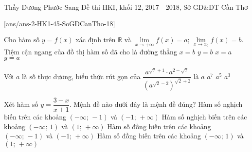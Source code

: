 \begin{name}
	{Thầy Dương Phước Sang}
	{Đề thi HKI, khối 12, 2017 - 2018, Sở GD\&ĐT Cần Thơ}
\end{name}
\setcounter{ex}{0}\setcounter{bt}{0}
[ans/ans-2-HK1-45-SoGDCanTho-18]

\begin{ex}%
	Cho hàm số $y=f(x)$ xác định trên $\mathbb{R}$ và $\displaystyle\lim\limits_{x\to +\infty}f(x)=a;\,\displaystyle\lim\limits_{x\to x_0}f(x)=b$. Tiệm cận ngang của đồ thị hàm số đã cho là đường thẳng
	\choice
	{$x=b$}
	{$y=b$}
	{$x=a$}
	{\True $y=a$}
\end{ex}

\begin{ex}%
	Với $a$ là số thực dương, biểu thức rút gọn của $\dfrac{a^{\sqrt{7}+1}\cdot a^{2-\sqrt{7}}}{\left(a^{\sqrt{2}-2}\right)^{\sqrt{2}+2}}$ là
	\choice
	{$a$}
	{$a^7$}
	{\True $a^5$}
	{$a^3$}
\end{ex}

\begin{ex}%
	Xét hàm số $y=\dfrac{3-x}{x+1}$. Mệnh đề nào dưới đây là mệnh đề đúng?
	\choice
	{\True Hàm số nghịch biến trên các khoảng $(-\infty;\,-1)$ và $(-1;\,+\infty)$}
	{Hàm số nghịch biến trên các khoảng $(-\infty;\,1)$ và $(1;\,+\infty)$}
	{Hàm số đồng biến trên các khoảng $(-\infty;\,-1)$ và $(-1;\,+\infty)$}
	{Hàm số đồng biến trên các khoảng $(-\infty;\,1)$ và $(1;\,+\infty)$}
\end{ex}

